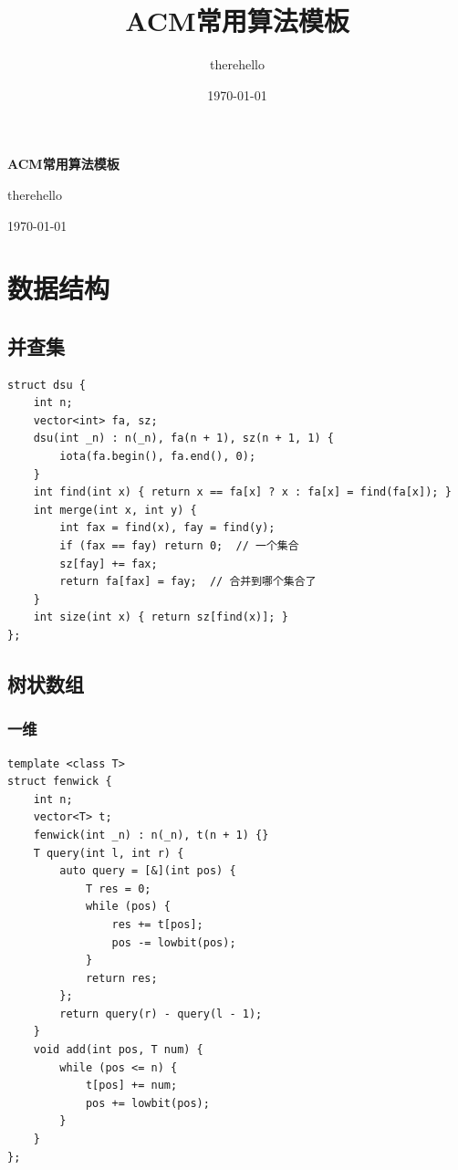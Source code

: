 \documentclass[UTF8]{ctexart}
\title{ACM常用算法模板}
\author{therehello}
\date{\today}
\newcommand\blankpage{
    \null
    \thispagestyle{empty}
    \addtocounter{page}{-1}
    \newpage
}
\begin{document}
\begin{sloppypar}

\begin{titlepage}
    \centering
    {\fontsize{40pt}{0pt}\selectfont \textbf{ACM常用算法模板}\par} %
    \vfill %
    {\fontsize{12pt}{0pt}\selectfont therehello\par} %
    \today %
\end{titlepage}

\blankpage

\tableofcontents

\clearpage

\section{数据结构}

\subsection{并查集}

\begin{lstlisting}[style=cpp]
struct dsu {
    int n;
    vector<int> fa, sz;
    dsu(int _n) : n(_n), fa(n + 1), sz(n + 1, 1) {
        iota(fa.begin(), fa.end(), 0);
    }
    int find(int x) { return x == fa[x] ? x : fa[x] = find(fa[x]); }
    int merge(int x, int y) {
        int fax = find(x), fay = find(y);
        if (fax == fay) return 0;  // 一个集合
        sz[fay] += fax;
        return fa[fax] = fay;  // 合并到哪个集合了
    }
    int size(int x) { return sz[find(x)]; }
};
\end{lstlisting}

\subsection{树状数组}

\subsubsection{一维}

\begin{lstlisting}[style=cpp]
template <class T>
struct fenwick {
    int n;
    vector<T> t;
    fenwick(int _n) : n(_n), t(n + 1) {}
    T query(int l, int r) {
        auto query = [&](int pos) {
            T res = 0;
            while (pos) {
                res += t[pos];
                pos -= lowbit(pos);
            }
            return res;
        };
        return query(r) - query(l - 1);
    }
    void add(int pos, T num) {
        while (pos <= n) {
            t[pos] += num;
            pos += lowbit(pos);
        }
    }
};
\end{lstlisting}


\end{sloppypar}
\end{document}

